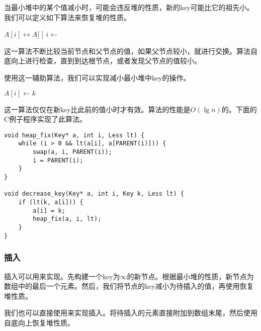 \documentclass[UTF8]{article}
\begin{document}
当最小堆中的某个值减小时，可能会违反堆的性质，新的key可能比它的祖先小。我们可以定义如下算法来恢复堆的性质。

\begin{algorithmic}[1]
    \State {} $A[i] \leftrightarrow A[$  $]$
    \State $i \gets$  
  \EndWhile
\EndFunction
\end{algorithmic}

这一算法不断比较当前节点和父节点的值，如果父节点较小，就进行交换。算法自底向上进行检查，直到到达根节点，或者发现父节点的值较小。

使用这一辅助算法，我们可以实现减小最小堆中key的操作。

\begin{algorithmic}[1]
    \State $A[i] \gets k$
    \State {}
  \EndIf
\EndFunction
\end{algorithmic}

这一算法仅仅在新key比此前的值小时才有效。算法的性能是$O(\lg n)$的。下面的C例子程序实现了此算法。

\lstset{language=C}
\begin{lstlisting}
void heap_fix(Key* a, int i, Less lt) {
    while (i > 0 && lt(a[i], a[PARENT(i)])) {
        swap(a, i, PARENT(i));
        i = PARENT(i);
    }
}

void decrease_key(Key* a, int i, Key k, Less lt) {
    if (lt(k, a[i])) {
        a[i] = k;
        heap_fix(a, i, lt);
    }
}
\end{lstlisting}

\subsubsection{插入}

插入可以用来实现\cite{CLRS}。先构建一个key为$\infty$的新节点。根据最小堆的性质，新节点为数组中的最后一个元素。然后，我们将节点的key减小为待插入的值，再使用恢复堆性质。

我们也可以直接使用来实现插入。将待插入的元素直接附加到数组末尾，然后使用自底向上恢复堆性质。

\begin{algorithmic}[1]
  \State {}
  \State {}
\EndFunction
\end{algorithmic}
\end{document}

